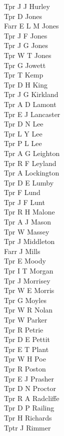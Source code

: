 \begin{multicols}{3}
  Tpr J J Hurley \\
  Tpr D Jones \\
  Farr E L M Jones \\
  Tpr J F Jones \\
  Tpr J G Jones \\
  Tpr W T Jones \\
  Tpr G Jowett \\
  Tpr T Kemp \\
  Tpr D H King \\
  Tpr J G Kirkland \\
  Tpr A D Lamont \\
  Tpr E J Lancaster \\
  Tpr D N Lee \\
  Tpr L Y Lee \\
  Tpr P L Lee \\
  Tpr A G Leighton \\
  Tpr R F Leyland \\
  Tpr A Lockington \\
  Tpr D E Lumby \\
  Tpr F Lund \\
  Tpr J F Lunt \\
  Tpr R H Malone \\
  Tpr A J Mason \\
  Tpr W Massey \\
  Tpr J Middleton \\
  Farr J Mills \\
  Tpr E Moody \\
  Tpr I T Morgan \\
  Tpr J Morrisey \\
  Tpr W E Morris \\
  Tpr G Moyles \\
  Tpr W R Nolan \\
  Tpr W Parker \\
  Tpr R Petrie \\
  Tpr D E Pettit \\
  Tpr E T Plant \\
  Tpr W H Poe \\
  Tpr R Poston \\
  Tpr E J Prasher \\
  Tpr D N Proctor \\
  Tpr R A Radcliffe \\
  Tpr D P Railing \\
  Tpr H Richards \\
  Tptr J Rimmer \\

\end{multicols}
